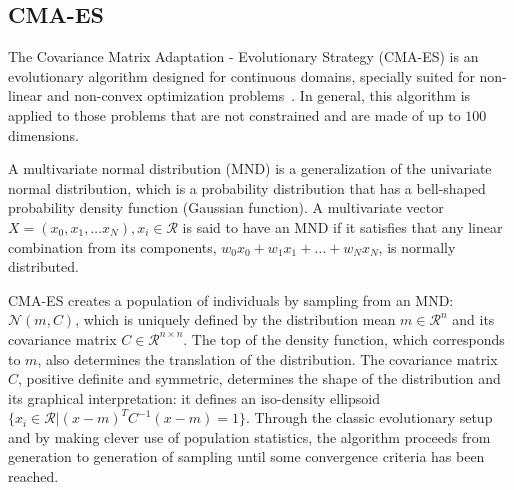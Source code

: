 \documentclass[conference]{IEEEtran}
\begin{document}
\subsection{CMA-ES} \label{sec:algCma}



The Covariance Matrix Adaptation - Evolutionary Strategy (CMA-ES) is an evolutionary algorithm designed for continuous domains, specially suited for non-linear and non-convex optimization problems~\cite{Hansen2006}. In general, this algorithm is applied to those problems that are not constrained and are made of up to $100$ dimensions.%

A multivariate normal distribution (MND) is a generalization of the univariate normal distribution, which is a probability distribution that has a bell-shaped probability density function (Gaussian function). A multivariate vector $X = (x_0, x_1, \dots x_N), x_i \in \mathcal{R}$ is said to have an MND if it satisfies that any linear combination from its components, $w_0x_0 + w_1x_1 + \dots + w_Nx_N$, is normally distributed.

CMA-ES creates a population of individuals by sampling from an MND: $\mathcal{N}(m,C)$, which is uniquely defined by the distribution mean $m \in \mathcal{R}^{n}$ and its covariance matrix $C \in \mathcal{R}^{n \times n}$. The top of the density function, which corresponds to $m$, also determines the translation of the distribution. The covariance matrix $C$, positive definite and symmetric, determines the shape of the distribution and its graphical interpretation: it defines an iso-density ellipsoid $\{ x_i \in \mathcal{R} | (x - m)^T C^{-1} (x - m) = 1\}$. Through the classic evolutionary setup and by making clever use of population statistics, the algorithm proceeds from generation to generation of sampling until some convergence criteria has been reached. 
\end{document}
